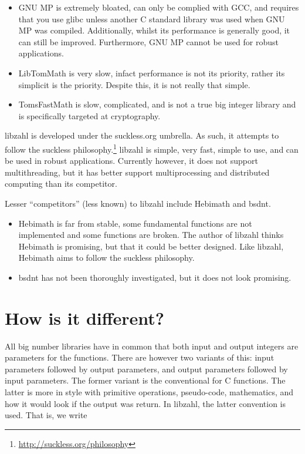 \begin{itemize}
\item
GNU MP is extremely bloated, can only be complied with
GCC, and requires that you use glibc unless another C
standard library was used when GNU MP was compiled.
Additionally, whilst its performance is generally good,
it can still be improved. Furthermore, GNU MP cannot be
used for robust applications.

\item
LibTomMath is very slow, infact performance is not its
priority, rather its simplicit is the priority. Despite
this, it is not really that simple.

\item
TomsFastMath is slow, complicated, and is not a true
big integer library and is specifically targeted at
cryptography.
\end{itemize}

libzahl is developed under the suckless.org umbrella.
As such, it attempts to follow the suckless
philosophy.\footnote{\href{http://suckless.org/philosophy}
{http://suckless.org/philosophy}} libzahl is simple,
very fast, simple to use, and can be used in robust
applications. Currently however, it does not support
multithreading, but it has better support multiprocessing
and distributed computing than its competitor.

Lesser ``competitors'' (less known) to libzahl include
Hebimath and bsdnt.

\begin{itemize}
\item
Hebimath is far from stable, some fundamental functions
are not implemented and some functions are broken. The
author of libzahl thinks Hebimath is promising, but that
it could be better designed. Like libzahl, Hebimath aims
to follow the suckless philosophy.

\item
bsdnt has not been thoroughly investigated, but it
does not look promising.
\end{itemize}


\newpage
\section{How is it different?}
\label{sec:How is it different?}

All big number libraries have in common that both input
and output integers are parameters for the functions.
There are however two variants of this: input parameters
followed by output parameters, and output parameters
followed by input parameters. The former variant is the
conventional for C functions. The latter is more in style
with primitive operations, pseudo-code, mathematics, and
how it would look if the output was return. In libzahl, the
latter convention is used. That is, we write

